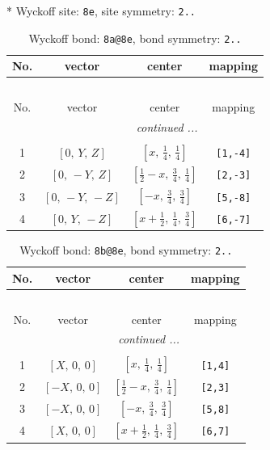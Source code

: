 \documentclass[fleqn,8pt]{jsarticle}
\begin{document}
* Wyckoff site: {\tt 8e}, site symmetry: {\tt 2..}
\renewcommand{\arraystretch}{1.2}
\begin{longtable}{cccc}
\caption{Wyckoff bond: {\tt 8a@8e}, bond symmetry: {\tt 2..}}
 \\
 \hline \hline
No. & vector & center & mapping \\ \hline \endfirsthead

\multicolumn{3}{l}{\tablename\ \thetable{}} \\
 \hline \hline
No. & vector & center & mapping \\ \hline \endhead

 \hline \hline
\multicolumn{3}{r}{\footnotesize\it continued ...} \\ \endfoot

 \hline \hline
\multicolumn{3}{r}{} \\ \endlastfoot

1 & $\left[ 0,\, Y,\, Z \right]$ & $\left[ x,\, \frac{1}{4},\, \frac{1}{4} \right]$ & {\tt [1,-4]} \\ \hline
2 & $\left[ 0,\, - Y,\, Z \right]$ & $\left[ \frac{1}{2} - x,\, \frac{3}{4},\, \frac{1}{4} \right]$ & {\tt [2,-3]} \\ \hline
3 & $\left[ 0,\, - Y,\, - Z \right]$ & $\left[ - x,\, \frac{3}{4},\, \frac{3}{4} \right]$ & {\tt [5,-8]} \\ \hline
4 & $\left[ 0,\, Y,\, - Z \right]$ & $\left[ x + \frac{1}{2},\, \frac{1}{4},\, \frac{3}{4} \right]$ & {\tt [6,-7]} \\
\end{longtable}
\renewcommand{\arraystretch}{1.2}
\begin{longtable}{cccc}
\caption{Wyckoff bond: {\tt 8b@8e}, bond symmetry: {\tt 2..}}
 \\
 \hline \hline
No. & vector & center & mapping \\ \hline \endfirsthead

\multicolumn{3}{l}{\tablename\ \thetable{}} \\
 \hline \hline
No. & vector & center & mapping \\ \hline \endhead

 \hline \hline
\multicolumn{3}{r}{\footnotesize\it continued ...} \\ \endfoot

 \hline \hline
\multicolumn{3}{r}{} \\ \endlastfoot

1 & $\left[ X,\, 0,\, 0 \right]$ & $\left[ x,\, \frac{1}{4},\, \frac{1}{4} \right]$ & {\tt [1,4]} \\ \hline
2 & $\left[ - X,\, 0,\, 0 \right]$ & $\left[ \frac{1}{2} - x,\, \frac{3}{4},\, \frac{1}{4} \right]$ & {\tt [2,3]} \\ \hline
3 & $\left[ - X,\, 0,\, 0 \right]$ & $\left[ - x,\, \frac{3}{4},\, \frac{3}{4} \right]$ & {\tt [5,8]} \\ \hline
4 & $\left[ X,\, 0,\, 0 \right]$ & $\left[ x + \frac{1}{2},\, \frac{1}{4},\, \frac{3}{4} \right]$ & {\tt [6,7]} \\
\end{longtable}
\end{document}

